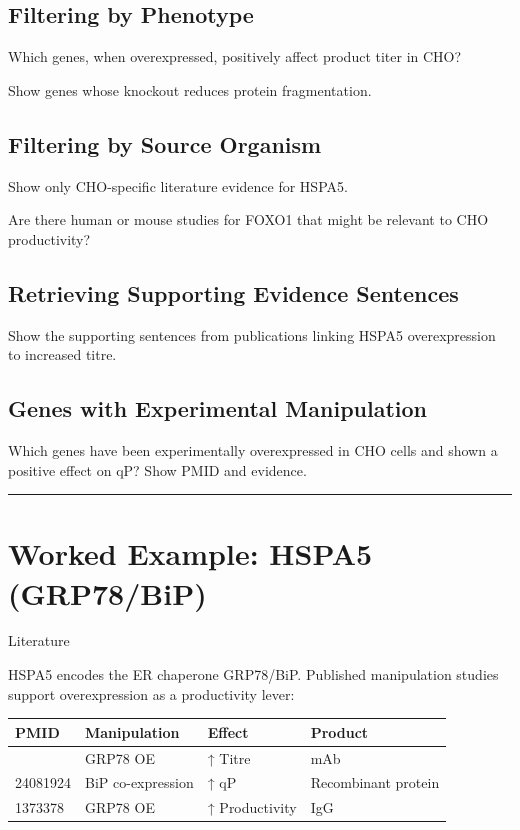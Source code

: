 \documentclass[
  letterpaper,
  oneside,
  open=any]{scrbook}
\newcounter{none} %
\begin{document}
\subsection{Filtering by Phenotype}\label{filtering-by-phenotype}

Which genes, when overexpressed, positively affect product titer in CHO?

Show genes whose knockout reduces protein fragmentation.

\subsection{Filtering by Source
Organism}\label{filtering-by-source-organism}

Show only CHO-specific literature evidence for HSPA5.

Are there human or mouse studies for FOXO1 that might be relevant to CHO
productivity?

\subsection{Retrieving Supporting Evidence
Sentences}\label{retrieving-supporting-evidence-sentences}

Show the supporting sentences from publications linking HSPA5
overexpression to increased titre.

\subsection{Genes with Experimental
Manipulation}\label{genes-with-experimental-manipulation}

Which genes have been experimentally overexpressed in CHO cells and
shown a positive effect on qP? Show PMID and evidence.

\begin{center}\rule{0.5\linewidth}{0.5pt}\end{center}

\section{Worked Example: HSPA5
(GRP78/BiP)}\label{worked-example-hspa5-grp78bip}

{Literature}

HSPA5 encodes the ER chaperone GRP78/BiP. Published manipulation studies
support overexpression as a productivity lever:

{\def\LTcaptype{none} %
\begin{longtable}[]{@{}llll@{}}
\toprule\noalign{}
PMID & Manipulation & Effect & Product \\
\midrule\noalign{}
\endhead
\bottomrule\noalign{}
\endlastfoot
32624757 & GRP78 OE & ↑ Titre & mAb \\
24081924 & BiP co-expression & ↑ qP & Recombinant protein \\
1373378 & GRP78 OE & ↑ Productivity & IgG \\
\end{longtable}
}
\end{document}
